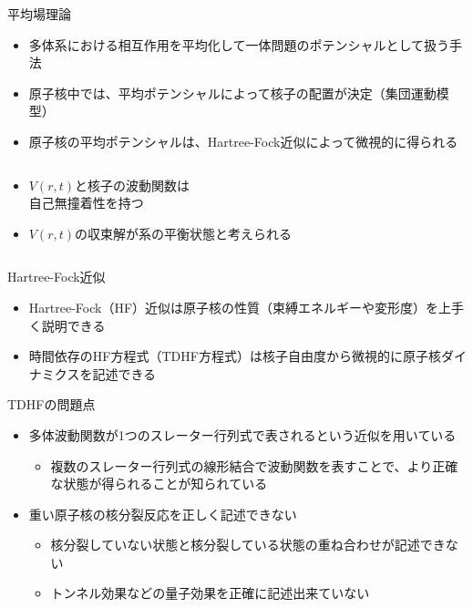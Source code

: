 \documentclass[14pt,aspectratio=169,xcolor=dvipsnames,table,dvipdfmx]{beamer}
\theoremstyle{definition}
\begin{document}
\begin{frame}{平均場理論}
  \begin{itemize}
    \item 多体系における相互作用を平均化して一体問題のポテンシャルとして扱う手法
    \item 原子核中では、平均ポテンシャルによって核子の配置が決定（集団運動模型）
    \item 原子核の平均ポテンシャルは、Hartree-Fock近似によって微視的に得られる
  \end{itemize}
  \begin{columns}[t]
    \begin{column}{.5\textwidth}
      \begin{itemize}
        \item $V(r,t)$と核子の波動関数は\\自己無撞着性を持つ
        \item $V(r,t)$の収束解が系の平衡状態と考えられる
      \end{itemize}
    \end{column}
    \begin{column}{.5\textwidth}
    \end{column}
  \end{columns}
\end{frame}
\begin{frame}{Hartree-Fock近似}
  \begin{itemize}
    \item Hartree-Fock（HF）近似は原子核の性質（束縛エネルギーや変形度）を上手く説明できる
    \item 時間依存のHF方程式（TDHF方程式）は核子自由度から微視的に原子核ダイナミクスを記述できる
  \end{itemize}
  \begin{block}{TDHFの問題点}
    \begin{itemize}
      \item 多体波動関数が1つのスレーター行列式で表されるという近似を用いている
            \begin{itemize}
              \item 複数のスレーター行列式の線形結合で波動関数を表すことで、より正確な状態が得られることが知られている
            \end{itemize}
      \item 重い原子核の核分裂反応を正しく記述できない
            \begin{itemize}
              \item 核分裂していない状態と核分裂している状態の重ね合わせが記述できない
              \item トンネル効果などの量子効果を正確に記述出来ていない
            \end{itemize}
    \end{itemize}
  \end{block}
\end{frame}
\end{document}
